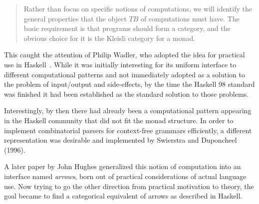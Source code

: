 \begin{quote}
Rather than focus on specific notions of computations, we will identify the
general properties that the object $TB$ of computations must have. The basic
requirement is that programs should form a category, and the obvious choice for
it is the Kleisli category for a monad.
\end{quote}

This caught the attention of Philip Wadler, who adopted the idea for practical
use in Haskell~\cite[p. 12-23]{hask-history}. While it was initially
interesting for its uniform interface to different computational patterns and
not immediately adopted as a solution to the problem of input/output and
side-effects, by the time the Haskell 98 standard was finished it had been
established as the standard solution to those problems.

Interestingly, by then there had already been a computational pattern
appearing in the Haskell community that did not fit the monad structure.
In order to implement combinatorial parsers for context-free grammars
efficiently, a different representation was desirable and implemented by
Swierstra and Duponcheel (1996).

A later paper by John Hughes generalized this notion of computation into
an interface named \emph{arrows}, born out of practical considerations
of actual language use. Now trying to go the other direction from
practical motivation to theory, the goal became to find a categorical
equivalent of arrows as described in Haskell.

%
%
